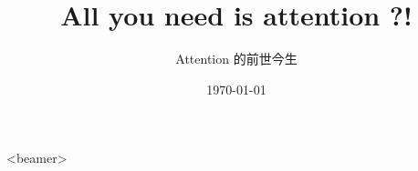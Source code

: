\title{All you need is attention ?!}
\subtitle{Attention 的前世今生}
\author[liugang06]{}
\date{\today}

\begin{frame}[plain]
  \titlepage
\end{frame}


\begin{frame}<beamer>{\contentsname}
    \tableofcontents
\end{frame}

